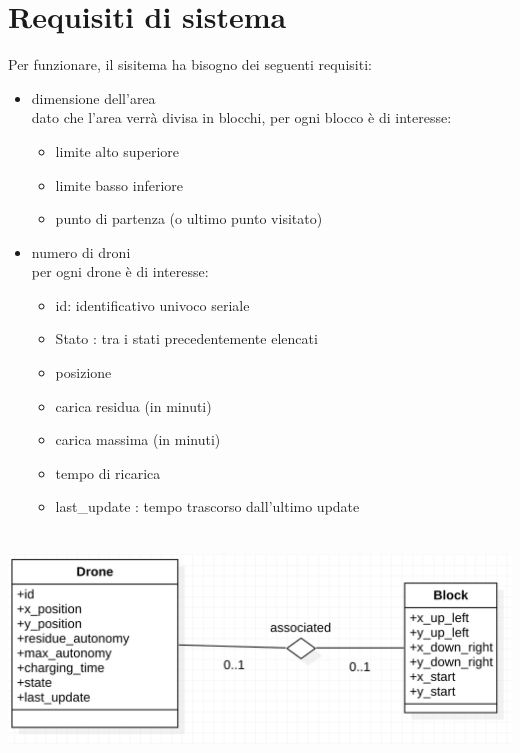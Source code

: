 \documentclass[a4paper, 12pt]{report}
\begin{document}
\section{Requisiti di sistema}
Per funzionare, il sisitema ha bisogno dei seguenti requisiti:
\begin{itemize}
    \item dimensione dell'area\\
    dato che l'area verrà divisa in blocchi, per ogni blocco è di interesse:
    \begin{itemize}
        \item limite alto superiore
        \item limite basso inferiore
        \item punto di partenza (o ultimo punto visitato)
    \end{itemize}
    \item numero di droni\\
    per ogni drone è di interesse:
    \begin{itemize}
        \item id: identificativo univoco seriale
        \item Stato : tra i stati precedentemente elencati
        \item posizione 
        \item carica residua (in minuti)
        \item carica massima (in minuti)
        \item tempo di ricarica 
        \item last\_update : tempo trascorso dall'ultimo update
    \end{itemize}
\end{itemize}
\newpage
\includegraphics[height=6.25cm]{image/ER.png}\\
\
\end{document}
